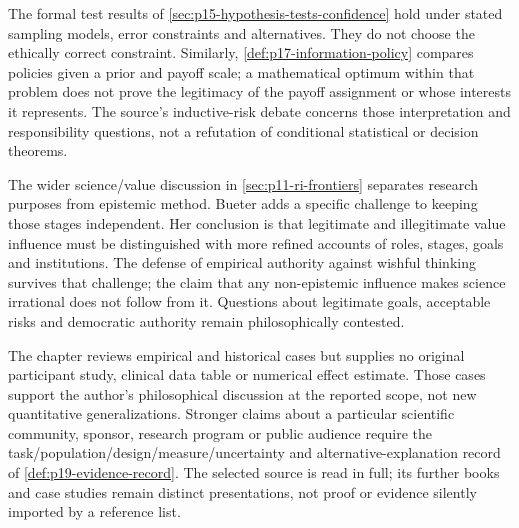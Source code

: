 The formal test results of \cref{sec:p15-hypothesis-tests-confidence}
hold under stated sampling models, error constraints and alternatives.
They do not choose the ethically correct constraint. Similarly,
\cref{def:p17-information-policy} compares policies given a prior and
payoff scale; a mathematical optimum within that problem does not prove
the legitimacy of the payoff assignment or whose interests it represents.
The source's inductive-risk debate concerns those interpretation and
responsibility questions, not a refutation of conditional statistical or
decision theorems.

The wider science/value discussion in \cref{sec:p11-ri-frontiers}
separates research purposes from epistemic method. Bueter adds a specific
challenge to keeping those stages independent. Her conclusion is that
legitimate and illegitimate value influence must be distinguished with
more refined accounts of roles, stages, goals and institutions. The defense
of empirical authority against wishful thinking survives that challenge;
the claim that any non-epistemic influence makes science irrational does not
follow from it. Questions about legitimate goals, acceptable risks and
democratic authority remain philosophically contested.

The chapter reviews empirical and historical cases but supplies no original
participant study, clinical data table or numerical effect estimate. Those
cases support the author's philosophical discussion at the reported scope,
not new quantitative generalizations. Stronger claims about a particular
scientific community, sponsor, research program or public audience require
the task/population/design/measure/uncertainty and alternative-explanation
record of \cref{def:p19-evidence-record}. The selected source is read in
full; its further books and case studies remain distinct presentations,
not proof or evidence silently imported by a reference list.
